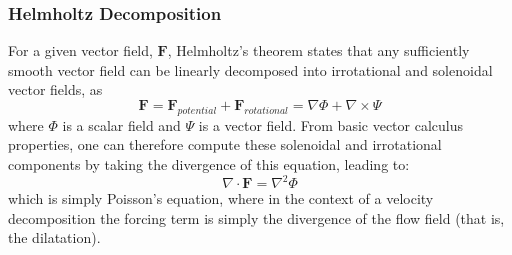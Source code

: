 \subsubsection{Helmholtz Decomposition}
For a given vector field, $\mathbf{F}$, Helmholtz's theorem states that any sufficiently smooth vector field can be linearly decomposed into irrotational and solenoidal vector fields, as
\begin{equation}
\mathbf{F} = \mathbf{F}_{potential} + \mathbf{F}_{rotational} = \nabla \Phi + \nabla \times \Psi
\end{equation}
where $\Phi$ is a scalar field and $\Psi$ is a vector field.
From basic vector calculus properties, one can therefore compute these solenoidal and irrotational components by taking the divergence of this equation, leading to:
\begin{equation}
\nabla \cdot \mathbf{F} = \nabla^{2} \Phi
\end{equation}
which is simply Poisson's equation, where in the context of a velocity decomposition the forcing term is simply the divergence of the flow field (that is, the dilatation).

